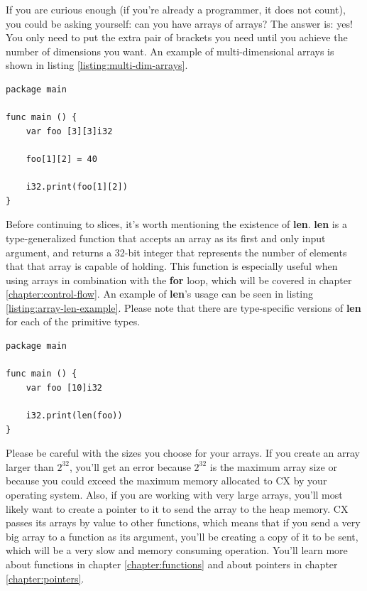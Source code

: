 \documentclass[11pt,fleqn,openany]{book} %
\begin{document}
If you are curious enough (if you're already a programmer, it does not count), you could be asking yourself: can you have arrays of arrays? The answer is: yes! You only need to put the extra pair of brackets you need until you achieve the number of dimensions you want. An example of multi-dimensional arrays is shown in listing \ref{listing:multi-dim-arrays}.

\begin{lstlisting}[caption={Multi-dimensional arrays},captionpos=b,label={listing:multi-dim-arrays}]
package main

func main () {
	var foo [3][3]i32
    
    foo[1][2] = 40
    
    i32.print(foo[1][2])
}
\end{lstlisting}

Before continuing to slices, it's worth mentioning the existence of \textbf{len}. \textbf{len} is a type-generalized function that accepts an array as its first and only input argument, and returns a 32-bit integer that represents the number of elements that that array is capable of holding. This function is especially useful when using arrays in combination with the \textbf{for} loop, which will be covered in chapter \ref{chapter:control-flow}. An example of \textbf{len}'s usage can be seen in listing \ref{listing:array-len-example}. Please note that there are type-specific versions of \textbf{len} for each of the primitive types.

\begin{lstlisting}[caption={Printing array length},captionpos=b,label={listing:array-len-example}]
package main

func main () {
	var foo [10]i32
    
    i32.print(len(foo))
}
\end{lstlisting}

Please be careful with the sizes you choose for your arrays. If you create an array larger than $2^{32}$, you'll get an error because $2^{32}$ is the maximum array size or because you could exceed the maximum memory allocated to CX by your operating system. Also, if you are working with very large arrays, you'll most likely want to create a pointer to it to send the array to the heap memory. CX passes its arrays by value to other functions, which means that if you send a very big array to a function as its argument, you'll be creating a copy of it to be sent, which will be a very slow and memory consuming operation. You'll learn more about functions in chapter \ref{chapter:functions} and about pointers in chapter \ref{chapter:pointers}.
\end{document}
